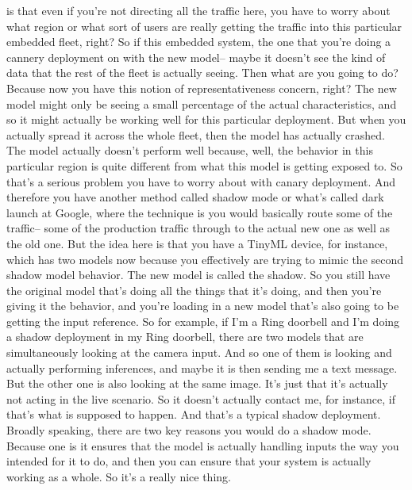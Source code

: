 {{{{    is that even if you're not directing all the traffic here,
    you have to worry about what region or what sort of users
    are really getting the traffic into this particular embedded fleet, right?
    So if this embedded system, the one that you're
    doing a cannery deployment on with the new model--
    maybe it doesn't see the kind of data that the rest of the fleet
    is actually seeing.
    Then what are you going to do?
    Because now you have this notion of representativeness concern, right?
    The new model might only be seeing a small percentage
    of the actual characteristics, and so it might actually be working well
    for this particular deployment.
    But when you actually spread it across the whole fleet,
    then the model has actually crashed.
    The model actually doesn't perform well because, well,
    the behavior in this particular region is quite different from what
    this model is getting exposed to.
    So that's a serious problem you have to worry about with canary deployment.
    And therefore you have another method called shadow mode
    or what's called dark launch at Google, where
    the technique is you would basically route some of the traffic--
    some of the production traffic through to the actual new one as well as
    the old one.
    But the idea here is that you have a TinyML device, for instance,
    which has two models now because you effectively
    are trying to mimic the second shadow model behavior.
    The new model is called the shadow.
    So you still have the original model that's doing all the things
    that it's doing, and then you're giving it the behavior,
    and you're loading in a new model that's also going
    to be getting the input reference.
    So for example, if I'm a Ring doorbell and I'm
    doing a shadow deployment in my Ring doorbell,
    there are two models that are simultaneously
    looking at the camera input.
    And so one of them is looking and actually performing inferences,
    and maybe it is then sending me a text message.
    But the other one is also looking at the same image.
    It's just that it's actually not acting in the live scenario.
    So it doesn't actually contact me, for instance,
    if that's what is supposed to happen.
    And that's a typical shadow deployment.
    Broadly speaking, there are two key reasons you would do a shadow mode.
    Because one is it ensures that the model is actually handling inputs the way
    you intended for it to do, and then you can ensure that your system is actually
    working as a whole.
    So it's a really nice thing.
}}}}

